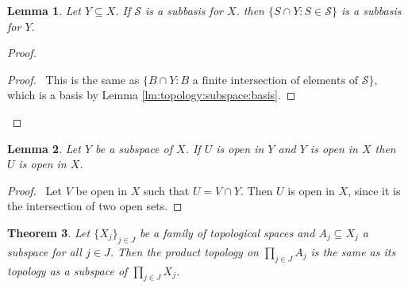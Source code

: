 \documentclass{book}
\newtheorem{lm}{Lemma}[chapter]
\newtheorem{thm}[lm]{Theorem}
\theoremstyle{definition}
\begin{document}
  \begin{lm}
    \label{lm:topology:subspace:subbasis}
    Let $Y \subseteq X$. If $\mathcal{S}$ is a subbasis for $X$. then $\{ S \cap 
    Y 
    : 
    S \in \mathcal{S} \}$ is a subbasis for $Y$.
  \end{lm}
  
  \begin{proof}
    \begin{proof}
      \pf\ This is the same as $\{ B \cap Y : B \text{ a finite intersection of 
        elements of } \mathcal{S} \}$, which is a basis by Lemma 
      \ref{lm:topology:subspace:basis}.
    \end{proof}
  \end{proof}
  
  \begin{lm}
    Let $Y$ be a subspace of $X$. If $U$ is open in $Y$ and $Y$ is open in $X$ 
    then $U$ is open in $X$.
  \end{lm}
  
  \begin{proof}
    \pf\ Let $V$ be open in $X$ such that $U = V \cap Y$. Then $U$ is open in 
    $X$, since it is the intersection of two open sets.
  \end{proof}
  
  \begin{thm}
    Let $\{ X_j \}_{j \in J}$ be a family of topological spaces and $A_j 
    \subseteq 
    X_j$ a subspace for all $j \in J$. Then the product topology on $\prod_{j 
      \in 
      J} A_j$ is the same as its topology as a subspace of $\prod_{j \in J} 
    X_j$.
  \end{thm}
  
\end{document}
